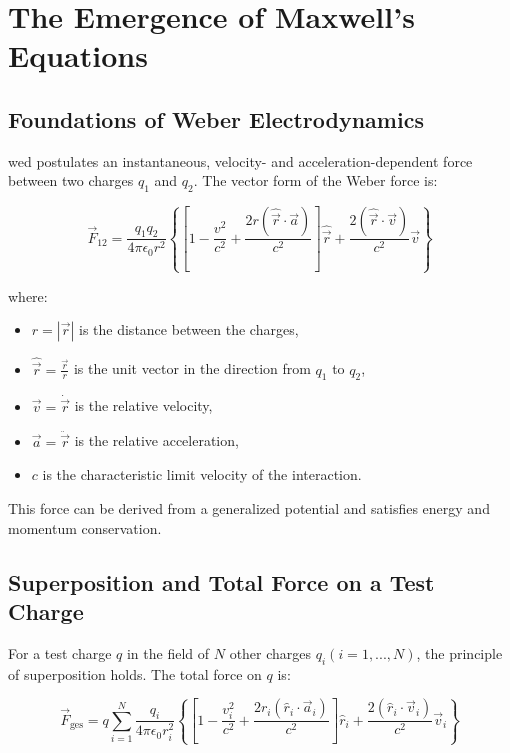 \chapter{The Emergence of Maxwell's Equations}
\label{ch:maxwell}
\section{Foundations of Weber Electrodynamics}
\label{sec:grundlagen}
\gls{wed} postulates an instantaneous, velocity- and acceleration-dependent force between two charges $q_1$ and $q_2$. The vector form of the Weber force is:

\begin{equation}
    \vec{F}_{12} = \frac{q_1 q_2}{4\pi\epsilon_0 r^2} \left\{ \left[ 1 - \frac{v^2}{c^2} + \frac{2r(\hat{\vec{r}}\cdot\vec{a})}{c^2} \right] \hat{\vec{r}} + \frac{2(\hat{\vec{r}}\cdot\vec{v})}{c^2} \vec{v} \right\}
\end{equation}

where:

\begin{itemize}
    \item $r = \left| \vec{r} \right|$ is the distance between the charges,
    \item $\hat{\vec{r}} = \frac{\vec{r}}{r}$ is the unit vector in the direction from $q_1$ to $q_2$,
    \item $\vec{v} = \dot{\vec{r}}$ is the relative velocity,
    \item $\vec{a} = \ddot{\vec{r}}$ is the relative acceleration,
    \item $c$ is the characteristic limit velocity of the interaction.
\end{itemize}

This force can be derived from a generalized potential and satisfies energy and momentum conservation.

\section{Superposition and Total Force on a Test Charge}
For a test charge $q$ in the field of $N$ other charges $q_i (i = 1,...,N)$, the principle of superposition holds. The total force on $q$ is:

\begin{equation}
    \label{eq:gesamtkraft}
    \vec{F}_{\text{ges}} = q \sum_{i=1}^N \frac{q_i}{4\pi\epsilon_0 r_i^2} \left\{ \left[ 1 - \frac{v_i^2}{c^2} + \frac{2r_i(\hat{r}_i\cdot\vec{a}_i)}{c^2} \right] \hat{r}_i + \frac{2(\hat{r}_i\cdot\vec{v}_i)}{c^2} \vec{v}_i \right\}
\end{equation}

